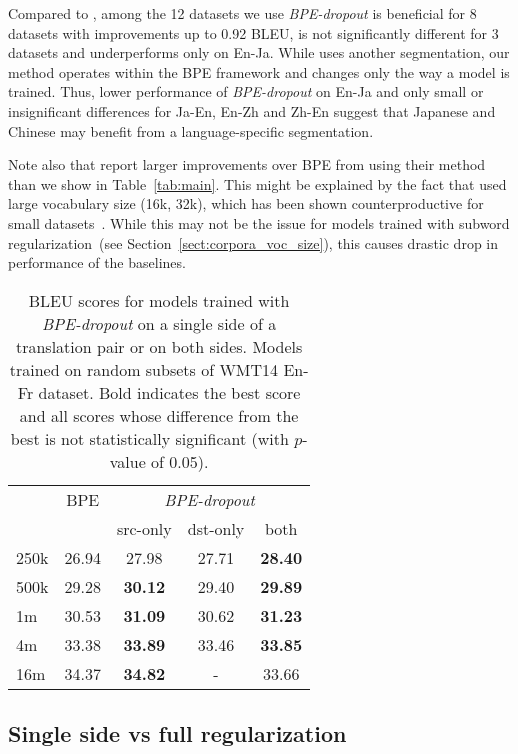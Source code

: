 \documentclass[11pt,a4paper]{article}
\begin{document}
Compared to \citet{sentencepiece}, among the 12 datasets we use \textit{BPE-dropout} is beneficial for 8 datasets with improvements up to  0{.}92 BLEU, is not significantly different for 3 datasets and underperforms only on En-Ja. While \citet{sentencepiece} uses another segmentation, our method operates within the BPE framework and changes only the way a model is trained. Thus, lower performance of \textit{BPE-dropout} on En-Ja and only small or insignificant differences for Ja-En, En-Zh and Zh-En suggest that Japanese and Chinese may benefit from a language-specific segmentation.

Note also that \citet{sentencepiece} report larger improvements over BPE from using their method than we show in Table~\ref{tab:main}. This might be explained by the fact that \citet{sentencepiece} used large vocabulary size (16k, 32k), which has been shown counterproductive for small datasets~\cite{sennrich-zhang-2019-revisiting,lowresBPE}. While this may not be the issue for models trained with subword regularization~(see Section~\ref{sect:corpora_voc_size}), this causes drastic drop in performance of the baselines.




\begin{table}[t!]
\centering
\begin{tabular}{lcccc}
\toprule
 & BPE & \multicolumn{3}{c}{\textit{BPE-dropout}}\\
 & & src-only  & dst-only & both\\

\midrule
250k & 26{.}94 & 27{.}98 & 27{.}71 & \bf{28{.}40} \\
500k & 29{.}28 & \bf{30{.}12} & 29{.}40 & \bf{29{.}89} \\
1m & 30{.}53 & \bf{31{.}09} & 30{.}62 & \bf{31{.}23} \\
4m & 33{.}38 & \bf{33{.}89} & 33{.}46 & \bf{33{.}85} \\
16m & 34{.}37 & \bf{34{.}82} & - & 33{.}66 \\
\bottomrule
\end{tabular}
\caption{BLEU scores for models trained with \textit{BPE-dropout} on a single side of a translation pair or on both sides. Models trained on random subsets of WMT14 En-Fr dataset. Bold indicates the best score and all scores whose difference from the best is not statistically significant (with $p$-value of 0.05).}
\label{tab:one_side}
\end{table}


\subsection{Single side vs full regularization}
\label{sect:drop_on_one_side}
\end{document}
